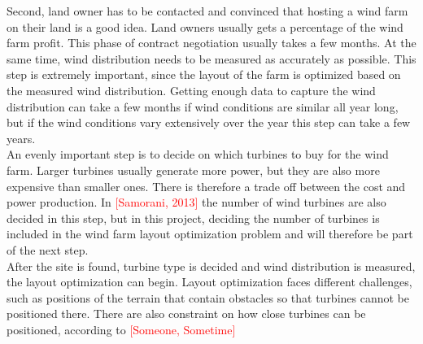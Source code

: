 \documentclass{article}
\begin{document}
\noindent Second, land owner has to be contacted and convinced that hosting a wind farm on their land is a good idea. Land owners usually gets a percentage of the wind farm profit. This phase of contract negotiation  usually takes a few months. At the same time, wind distribution needs to be measured as accurately as possible. This step is extremely important, since the layout of the farm is optimized based on the measured wind distribution. Getting enough data to capture the wind distribution can take a few months if wind conditions are similar all year long, but if the wind conditions vary extensively over the year this step can take a few years. \\

\noindent An evenly important step is to decide on which turbines to buy for the wind farm. Larger turbines usually generate more power, but they are also more expensive than smaller ones. There is therefore a trade off between the cost and power production. In \textcolor{red}{[Samorani, 2013]} the number of wind turbines are also decided in this step, but in this project, deciding the number of turbines is included in the wind farm layout optimization problem and will therefore be part of the next step. \\

\noindent After the site is found, turbine type is decided and wind distribution is measured, the layout optimization can begin. Layout optimization faces different challenges, such as positions of the terrain that contain obstacles so that turbines cannot be positioned there. There are also constraint on how close turbines can be positioned, according to \textcolor{red}{[Someone, Sometime]} 








\end{document}
